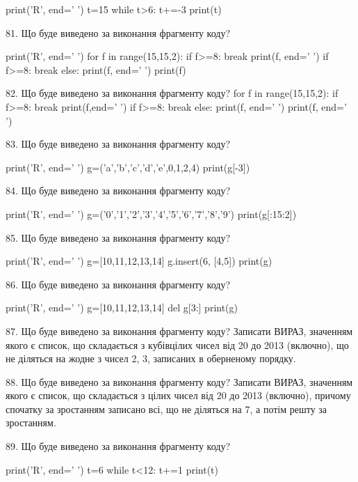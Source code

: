 \documentclass[11pt]{article}
\begin{document}
print('R', end=' ')
t=15
while t>6:
    t+=-3
print(t)



81. Що буде виведено за виконання фрагменту коду?

print('R', end=' ')
for f in range(15,15,2):
    if f>=8:
        break
        print(f, end=' ')
    if f>=8:
        break
    else:
        print(f, end=' ')
    print(f)


82. Що буде виведено за виконання фрагменту коду?
for f in range(15,15,2):
    if f>=8:
        break
        print(f,end=' ')
    if f>=8:
        break
else:
    print(f, end=' ')
print(f, end=' ')


83. Що буде виведено за виконання фрагменту коду?

print('R', end=' ')
g=('a','b','c','d','e',0,1,2,4)
print(g[-3])



84. Що буде виведено за виконання фрагменту коду?

print('R', end=' ')
g=('0','1','2','3','4','5','6','7','8','9')
print(g[:15:2])



85. Що буде виведено за виконання фрагменту коду?

print('R', end=' ')
g=[10,11,12,13,14]
g.insert(6, [4,5])
print(g)



86. Що буде виведено за виконання фрагменту коду?

print('R', end=' ')
g=[10,11,12,13,14]
del g[3:]
print(g)



87. Що буде виведено за виконання фрагменту коду?
Записати ВИРАЗ, значенням якого є список, що складається з кубівцілих чисел від 20 до 2013 (включно), що не діляться на жодне з чисел 2, 3, записаних в оберненому порядку.

88. Що буде виведено за виконання фрагменту коду?
Записати ВИРАЗ, значенням якого є список, що складається з цілих чисел від 20 до 2013 (включно), причому спочатку за зростанням записано всі, що не діляться на 7, а потім решту за зростанням.

89. Що буде виведено за виконання фрагменту коду?

print('R', end=' ')
t=6
while t<12:
    t+=1
print(t)
\end{document}

